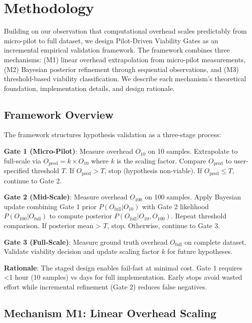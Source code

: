 \section{Methodology}

Building on our observation that computational overhead scales predictably from micro-pilot to full dataset, we design Pilot-Driven Viability Gates as an incremental empirical validation framework. The framework combines three mechanisms: (M1) linear overhead extrapolation from micro-pilot measurements, (M2) Bayesian posterior refinement through sequential observations, and (M3) threshold-based viability classification. We describe each mechanism's theoretical foundation, implementation details, and design rationale.

\subsection{Framework Overview}

The framework structures hypothesis validation as a three-stage process:

\textbf{Gate 1 (Micro-Pilot)}: Measure overhead $O_{10}$ on 10 samples. Extrapolate to full-scale via $O_{\text{pred}} = k \times O_{10}$ where $k$ is the scaling factor. Compare $O_{\text{pred}}$ to user-specified threshold $T$. If $O_{\text{pred}} > T$, stop (hypothesis non-viable). If $O_{\text{pred}} \leq T$, continue to Gate 2.

\textbf{Gate 2 (Mid-Scale)}: Measure overhead $O_{100}$ on 100 samples. Apply Bayesian update combining Gate 1 prior $P(O_{\text{full}} | O_{10})$ with Gate 2 likelihood $P(O_{100} | O_{\text{full}})$ to compute posterior $P(O_{\text{full}} | O_{10}, O_{100})$. Repeat threshold comparison. If posterior mean > $T$, stop. Otherwise, continue to Gate 3.

\textbf{Gate 3 (Full-Scale)}: Measure ground truth overhead $O_{\text{full}}$ on complete dataset. Validate viability decision and update scaling factor $k$ for future hypotheses.

\textbf{Rationale}: The staged design enables fail-fast at minimal cost. Gate 1 requires <1 hour (10 samples) vs days for full implementation. Early stops avoid wasted effort while incremental refinement (Gate 2) reduces false negatives.

\subsection{Mechanism M1: Linear Overhead Scaling}

